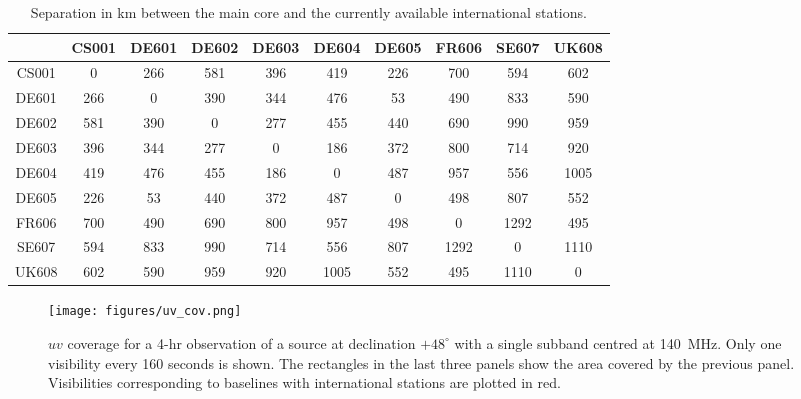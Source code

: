 \documentclass[graybox]{svmult}
\begin{document}
\begin{table}[h]
\centering
\begin{tabular}{cccccccccc}
\hline
\hline
      & CS001& DE601& DE602& DE603& DE604& DE605& FR606& SE607& UK608\\
\hline
 CS001&     0&   266&   581&   396&   419&   226&   700&   594&   602 \\
 DE601&   266&     0&   390&   344&   476&    53&   490&   833&   590 \\
 DE602&   581&   390&     0&   277&   455&   440&   690&   990&   959 \\
 DE603&   396&   344&   277&     0&   186&   372&   800&   714&   920 \\
 DE604&   419&   476&   455&   186&     0&   487&   957&   556&  1005 \\
 DE605&   226&    53&   440&   372&   487&     0&   498&   807&   552 \\
 FR606&   700&   490&   690&   800&   957&   498&     0&  1292&   495 \\
 SE607&   594&   833&   990&   714&   556&   807&  1292&     0&  1110 \\
 UK608&   602&   590&   959&   920&  1005&   552&   495&  1110&     0 \\
\hline
\end{tabular}
\caption{Separation in km between the main core and the currently available
international stations.
\label{tab:baselines}}
\end{table}

\begin{figure}[t]
\begin{center}
\texttt{[image: figures/uv\_cov.png]}
\caption{$uv$ coverage for a 4-hr observation of a source at declination
$+48^{\circ}$ with a single subband centred at 140~MHz. Only one visibility every 160 seconds is shown. The rectangles in the last three panels show the area covered by the previous panel. Visibilities corresponding to baselines with international
stations are plotted in red.}
\label{fig:uvcoverage}
\end{center}
\end{figure}
\end{document}
